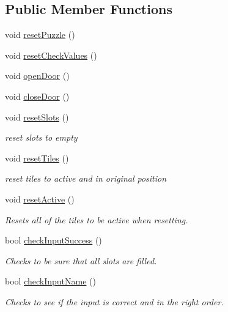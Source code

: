 \subsection*{Public Member Functions}
\begin{DoxyCompactItemize}
\item 
void \hyperlink{class_arith_completion_check_ab9599e148944886425068a34ae9b236b}{reset\+Puzzle} ()
\item 
void \hyperlink{class_arith_completion_check_a2dd62a0cac8f383172e3a7ef51c3e3a9}{reset\+Check\+Values} ()
\item 
void \hyperlink{class_arith_completion_check_a1499d7cc0dfc5e25ff71ed683a7e1cab}{open\+Door} ()
\item 
void \hyperlink{class_arith_completion_check_a98f38be633381fc1cc645506c854e4c1}{close\+Door} ()
\item 
void \hyperlink{class_arith_completion_check_a43f1f829ee2eb6fd6191c1e76565859b}{reset\+Slots} ()
\begin{DoxyCompactList}\small\item\em reset slots to empty \end{DoxyCompactList}\item 
void \hyperlink{class_arith_completion_check_ab9934c3847957162e5c0bccbe6a47c8c}{reset\+Tiles} ()
\begin{DoxyCompactList}\small\item\em reset tiles to active and in original position \end{DoxyCompactList}\item 
void \hyperlink{class_arith_completion_check_ab96e74dffadaa774579de016d1e4a355}{reset\+Active} ()
\begin{DoxyCompactList}\small\item\em Resets all of the tiles to be active when resetting. \end{DoxyCompactList}\item 
bool \hyperlink{class_arith_completion_check_a29984173a121cf0859ed1a08f4c0e5bd}{check\+Input\+Success} ()
\begin{DoxyCompactList}\small\item\em Checks to be sure that all slots are filled. \end{DoxyCompactList}\item 
bool \hyperlink{class_arith_completion_check_ae813642087af9661c17a03f8545d6f34}{check\+Input\+Name} ()
\begin{DoxyCompactList}\small\item\em Checks to see if the input is correct and in the right order. \end{DoxyCompactList}\end{DoxyCompactItemize}
